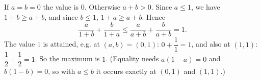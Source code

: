 If $a=b=0$ the value is $0$. Otherwise $a+b>0$. Since $a\le1$, we have $1+b\ge a+b$, and since $b\le1$, $1+a\ge a+b$. Hence
\[\dfrac{a}{1+b}+\dfrac{b}{1+a}\le\dfrac{a}{a+b}+\dfrac{b}{a+b}=1.\]
The value $1$ is attained, e.g. at $(a,b)=(0,1)$: $0+\dfrac11=1$, and also at $(1,1)$: $\dfrac12+\dfrac12=1$. So the maximum is $\boxed{1}$. (Equality needs $a(1-a)=0$ and $b(1-b)=0$, so with $a\le b$ it occurs exactly at $(0,1)$ and $(1,1)$.)
